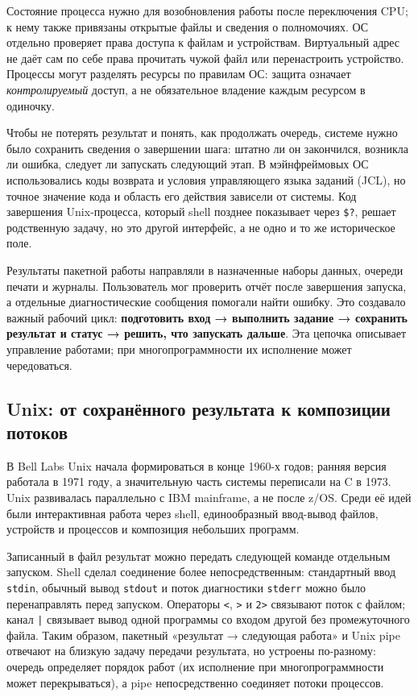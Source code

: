 Состояние процесса нужно для возобновления работы после переключения CPU;
к нему также привязаны открытые файлы и сведения о полномочиях. ОС отдельно
проверяет права доступа к файлам и устройствам. Виртуальный адрес не даёт
сам по себе права прочитать чужой файл или перенастроить устройство. Процессы
могут разделять ресурсы по правилам ОС: защита означает \emph{контролируемый}
доступ, а не обязательное владение каждым ресурсом в одиночку.

Чтобы не потерять результат и понять, как продолжать очередь, системе нужно
было сохранить сведения о завершении шага: штатно ли он закончился, возникла ли
ошибка, следует ли запускать следующий этап. В мэйнфреймовых ОС использовались
коды возврата и условия управляющего языка заданий (JCL), но точное значение
кода и область его действия зависели от системы. Код завершения Unix-процесса,
который shell позднее показывает через \texttt{\$?}, решает родственную задачу,
но это другой интерфейс, а не одно и то же историческое поле.

Результаты пакетной работы направляли в назначенные наборы данных, очереди
печати и журналы. Пользователь мог проверить отчёт после завершения запуска,
а отдельные диагностические сообщения помогали найти ошибку. Это создавало
важный рабочий цикл: \textbf{подготовить вход → выполнить задание → сохранить
результат и статус → решить, что запускать дальше}. Эта цепочка описывает
управление работами; при многопрограммности их исполнение может чередоваться.

\subsection{Unix: от сохранённого результата к композиции потоков}

В Bell Labs Unix начала формироваться в конце 1960-х годов; ранняя версия
работала в 1971 году, а значительную часть системы переписали на C в 1973.
Unix развивалась параллельно с IBM mainframe, а не после z/OS. Среди её идей
были интерактивная работа через shell, единообразный ввод-вывод файлов,
устройств и процессов и композиция небольших программ.

Записанный в файл результат можно передать следующей команде отдельным
запуском. Shell сделал соединение более непосредственным: стандартный ввод
\texttt{stdin}, обычный вывод \texttt{stdout} и поток диагностики
\texttt{stderr} можно было перенаправлять перед запуском. Операторы
\texttt{<}, \texttt{>} и \texttt{2>} связывают поток с файлом; канал
\texttt{|} связывает вывод одной программы со входом другой без промежуточного
файла. Таким образом, пакетный «результат → следующая работа» и Unix pipe
отвечают на близкую задачу передачи результата, но устроены по-разному:
очередь определяет порядок работ (их исполнение при многопрограммности может
перекрываться), а pipe непосредственно соединяет потоки процессов.

